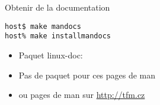 
\begin{frame}[fragile=singleslide]{Obtenir de la documentation}
  \begin{lstlisting}
host$ make mandocs
host% make installmandocs
  \end{lstlisting}  %
  \begin{itemize}
    \item Paquet linux-doc: 
    \item Pas de paquet pour ces pages de man 
    \item ou pages de man sur \url{http://tfm.cz}
  \end{itemize}
\end{frame}



